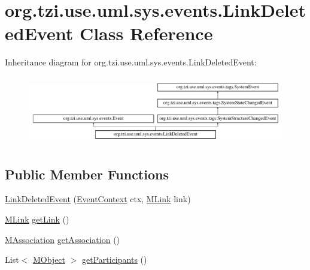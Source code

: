 \hypertarget{classorg_1_1tzi_1_1use_1_1uml_1_1sys_1_1events_1_1_link_deleted_event}{\section{org.\-tzi.\-use.\-uml.\-sys.\-events.\-Link\-Deleted\-Event Class Reference}
\label{classorg_1_1tzi_1_1use_1_1uml_1_1sys_1_1events_1_1_link_deleted_event}
}
Inheritance diagram for org.\-tzi.\-use.\-uml.\-sys.\-events.\-Link\-Deleted\-Event\-:\begin{figure}[H]
\begin{center}
\leavevmode
\includegraphics[height=3.010753cm]{classorg_1_1tzi_1_1use_1_1uml_1_1sys_1_1events_1_1_link_deleted_event}
\end{center}
\end{figure}
\subsection*{Public Member Functions}
\begin{DoxyCompactItemize}
\item 
\hyperlink{classorg_1_1tzi_1_1use_1_1uml_1_1sys_1_1events_1_1_link_deleted_event_abc6b5df42a4bb99c138816904e665d16}{Link\-Deleted\-Event} (\hyperlink{enumorg_1_1tzi_1_1use_1_1uml_1_1sys_1_1events_1_1tags_1_1_event_context}{Event\-Context} ctx, \hyperlink{interfaceorg_1_1tzi_1_1use_1_1uml_1_1sys_1_1_m_link}{M\-Link} link)
\item 
\hyperlink{interfaceorg_1_1tzi_1_1use_1_1uml_1_1sys_1_1_m_link}{M\-Link} \hyperlink{classorg_1_1tzi_1_1use_1_1uml_1_1sys_1_1events_1_1_link_deleted_event_a2772e90a17bed8d474604606ee35f3ae}{get\-Link} ()
\item 
\hyperlink{interfaceorg_1_1tzi_1_1use_1_1uml_1_1mm_1_1_m_association}{M\-Association} \hyperlink{classorg_1_1tzi_1_1use_1_1uml_1_1sys_1_1events_1_1_link_deleted_event_a9eb60ff96f3367d62956ab50e3d020b8}{get\-Association} ()
\item 
List$<$ \hyperlink{interfaceorg_1_1tzi_1_1use_1_1uml_1_1sys_1_1_m_object}{M\-Object} $>$ \hyperlink{classorg_1_1tzi_1_1use_1_1uml_1_1sys_1_1events_1_1_link_deleted_event_a4d5d35d7c3788445adcb8e8248123ad1}{get\-Participants} ()
\end{DoxyCompactItemize}


